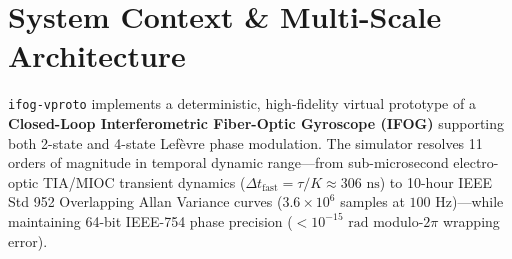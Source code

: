 \documentclass[11pt,a4paper]{article}
\begin{document}
\normalsize

\vspace{0.5em}
\tableofcontents
\newpage

\section{System Context \& Multi-Scale Architecture}

\texttt{ifog-vproto} implements a deterministic, high-fidelity virtual prototype of a \textbf{Closed-Loop Interferometric Fiber-Optic Gyroscope (IFOG)} supporting both 2-state and 4-state Lef\`evre phase modulation. The simulator resolves 11 orders of magnitude in temporal dynamic range---from sub-microsecond electro-optic TIA/MIOC transient dynamics ($\Delta t_{\text{fast}} = \tau / K \approx 306\text{ ns}$) to 10-hour IEEE Std 952 Overlapping Allan Variance curves ($3.6\times 10^6$ samples at $100\text{ Hz}$)---while maintaining 64-bit IEEE-754 phase precision ($< 10^{-15}\text{ rad}$ modulo-$2\pi$ wrapping error).
\end{document}
